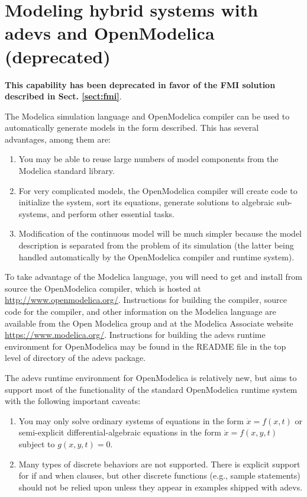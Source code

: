 \section{Modeling hybrid systems with adevs and OpenModelica (deprecated)}

{\bf This capability has been deprecated in favor of the FMI solution described in Sect. \ref{sect:fmi}}.

The Modelica simulation language and OpenModelica compiler can be used to automatically generate models in the form described. This has several advantages, among them are:
\begin{enumerate}
\item You may be able to reuse large numbers of model components from the Modelica standard library.
\item For very complicated models, the OpenModelica compiler will create code to initialize the system, sort its equations, generate solutions to algebraic sub-systems, and perform other essential tasks.
\item Modification of the continuous model will be much simpler because the model description is separated from the problem of its simulation (the latter being handled automatically by the OpenModelica compiler and runtime system).
\end{enumerate}

To take advantage of the Modelica language, you will need to get and install from source the OpenModelica compiler, which is hosted at \url{http://www.openmodelica.org/}. Instructions for building the compiler, source code for the compiler, and other information on the Modelica language are available from the Open Modelica group and at the Modelica Associate website \url{https://www.modelica.org/}. Instructions for building the adevs runtime environment for OpenModelica may be found in the README file in the top level of directory of the adevs package.

The adevs runtime environment for OpenModelica is relatively new, but aims to support most of the functionality of the standard OpenModelica runtime system with the following important caveats:
\begin{enumerate}
\item You may only solve ordinary systems of equations in the form $\dot{x}=f(x,t)$ or semi-explicit differential-algebraic equations in the form $\dot{x}=f(x,y,t)$ subject to $g(x,y,t)=0$.
\item Many types of discrete behaviors are not supported. There is explicit support for if and when clauses, but other discrete functions (e.g., sample statements) should not be relied upon unless they appear in examples shipped with adevs.
\end{enumerate}

